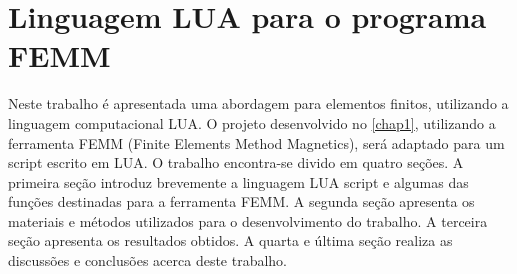 \chapter{Linguagem LUA para o programa FEMM}
\label{chap2}
Neste trabalho é apresentada uma abordagem para elementos finitos, utilizando a linguagem computacional LUA. O projeto desenvolvido no \ref{chap1}, utilizando a ferramenta FEMM (Finite Elements Method Magnetics), será adaptado para um script escrito em LUA. O trabalho encontra-se divido em quatro seções. A primeira seção introduz brevemente a linguagem LUA script e algumas das funções destinadas para a ferramenta FEMM. A segunda seção apresenta os materiais e métodos utilizados para o desenvolvimento do trabalho. A terceira seção apresenta os resultados obtidos. A quarta e última seção realiza as discussões e conclusões acerca deste trabalho.




